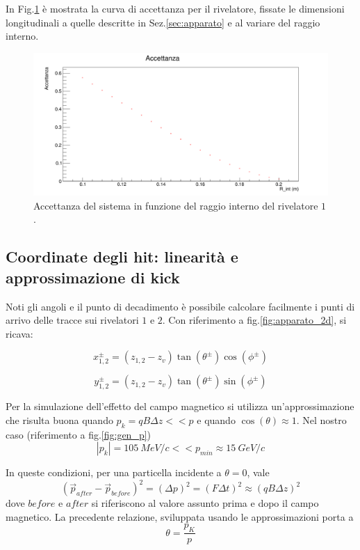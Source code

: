 \documentclass[8pt]{extarticle}
\begin{document}
In Fig.\ref{fig:acc_vs_rint} è mostrata la curva di accettanza per il rivelatore, fissate le dimensioni longitudinali a quelle descritte in Sez.\ref{sec:apparato} e al variare del raggio interno.

\begin{figure}
	\begin{center}
		\includegraphics[scale=0.3]{acc_vs_rint} 
		\caption{Accettanza del sistema in funzione del raggio interno del rivelatore $1$.}
		\label{fig:acc_vs_rint}
	\end{center}
\end{figure}


\subsection{Coordinate degli hit: linearità e approssimazione di kick}
Noti gli angoli e il punto di decadimento è possibile calcolare facilmente i punti di arrivo delle tracce sui rivelatori $1$ e $2$. Con riferimento a fig.\ref{fig:apparato_2d}, si ricava:

\begin{equation}
x_{1,2}^{\pm} = (z_{1,2} - z_v) \tan(\theta^{\pm})\cos(\phi^{\pm})
\end{equation}

\begin{equation}
y_{1,2}^{\pm} = (z_{1,2} - z_v) \tan(\theta^{\pm})\sin(\phi^{\pm})
\end{equation}


Per la simulazione dell'effetto del campo magnetico si utilizza un'approssimazione che risulta buona quando $p_k = qB\Delta z << p$ e quando $\cos(\theta) \approx 1$. Nel nostro caso (riferimento a fig.\ref{fig:gen_p})
$$
|p_k| = 105\ MeV/c << p_{min} \approx 15\ GeV/c
$$

In queste condizioni, per una particella incidente a $\theta = 0$, vale
$$
(\vec{p}_{after}-\vec{p}_{before})^2 = (\Delta p)^2 = (F \Delta t)^2 \approx (qB\Delta z)^2
$$
dove $before$ e $after$ si riferiscono al valore assunto prima e dopo il campo magnetico. La precedente relazione, sviluppata usando le approssimazioni porta a
$$
\theta = \frac{p_K}{p}
$$
\end{document}
